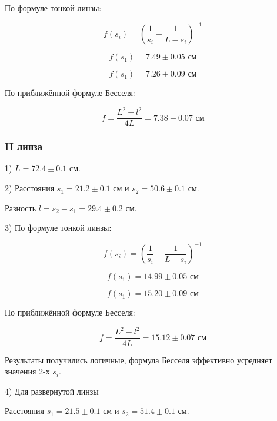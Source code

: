 \documentclass{astroedu-lab}
\begin{document}
\begin{problem}
По формуле тонкой линзы:

\begin{equation}
	f(s_i) = \left( \frac{1}{s_i} + \frac{1}{L-s_i} \right) ^{-1}
\end{equation}

\begin{equation}
	f(s_1) = 7.49 \pm 0.05 \text{ см}
\end{equation}

\begin{equation}
	f(s_1) = 7.26 \pm 0.09 \text{ см}
\end{equation}

По приближённой формуле Бесселя:

\begin{equation}
	f = \frac{L^2 - l^2}{4 L} = 7.38 \pm 0.07 \text{ см}
\end{equation}

\subsubsection{II линза}

1) $L = 72.4 \pm 0.1$ см.

2) Расстояния $s_1 = 21.2 \pm 0.1$ см и $s_2 = 50.6 \pm 0.1$ см.

Разность $l = s_2 - s_1 = 29.4 \pm 0.2$ см.

3) По формуле тонкой линзы:

\begin{equation}
	f(s_i) = \left( \frac{1}{s_i} + \frac{1}{L-s_i} \right) ^{-1}
\end{equation}

\begin{equation}
	f(s_1) = 14.99 \pm 0.05 \text{ см}
\end{equation}

\begin{equation}
	f(s_1) = 15.20 \pm 0.09 \text{ см}
\end{equation}

По приближённой формуле Бесселя:

\begin{equation}
	f = \frac{L^2 - l^2}{4 L} = 15.12 \pm 0.07 \text{ см}
\end{equation}

Результаты получились логичные, формула Бесселя эффективно усредняет значения 2-х $s_i$. 

4) Для развернутой линзы

Расстояния $s_1 = 21.5 \pm 0.1$ см и $s_2 = 51.4 \pm 0.1$ см.


\end{problem}
\end{document}

